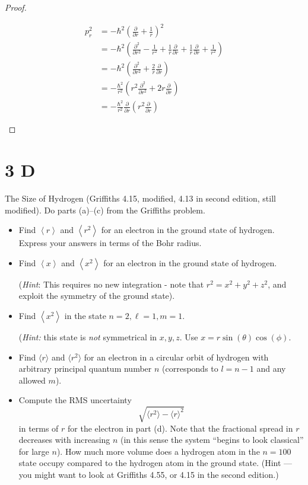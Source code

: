 \documentclass{article}
\begin{document}
\begin{proof}
\begin{itemize}
        \begin{align}
            p_r^2 &= -\hbar^2\left(\frac{\partial}{\partial r}+\frac{1}{r}\right)^2\\
            &= -\hbar^2\left(\frac{\partial^2}{\partial r^2}-\frac{1}{r^2}+\frac{1}{r}\frac{\partial}{\partial r}+\frac{1}{r}\frac{\partial }{\partial r}+\frac{1}{r^2}\right)\\
            &= -\hbar^2\left(\frac{\partial^2}{\partial r^2}+\frac{2}{r}\frac{\partial}{\partial r}\right)\\
            &= -\frac{\hbar^2}{r^2}\left(r^2\frac{\partial^2}{\partial r^2}+2r\frac{\partial}{\partial r}\right)\\
            &= -\frac{\hbar^2}{r^2}\frac{\partial}{\partial r}\left(r^2\frac{\partial}{\partial r}\right)
        \end{align}
    \end{itemize}
\end{proof}

\newpage

\section*{3 D}
\begin{ques}\label{q3}
The Size of Hydrogen (Griffiths 4.15, modified, 4.13 in second edition, still modified). Do parts (a)--(c) from the Griffiths problem.

\begin{itemize}
\item[(a)] Find $\left<r\right>$ and $\left<r^2\right>$ for an electron in the ground state of hydrogen. Express your answers in terms of the Bohr radius.
\item[(b)] Find $\left<x\right>$ and $\left<x^2\right>$ for an electron in the ground state of hydrogen. 

(\emph{Hint}: This requires no new integration - note that $r^2=x^2+y^2+z^2$, and exploit the symmetry of the ground state).

\item[(c)] Find $\left<x^2\right>$ in the state $n=2,\ell=1,m=1$. 

(\emph{Hint:} this state is \emph{not} symmetrical in $x,y,z$. Use $x=r\sin(\theta)\cos(\phi)$. 

\item[(d)] Find $\langle r\rangle$ and $\langle r^2\rangle$ for an electron in a circular orbit of hydrogen with arbitrary principal quantum number $n$ (corresponds to $l=n-1$ and any allowed $m$).

\item[(e)] Compute the RMS uncertainty
\[
\sqrt{\langle r^2\rangle - \langle r\rangle^2}
\]
in terms of $r$ for the electron in part (d). Note that the fractional spread in $r$ decreases with increasing $n$ (in this sense the system ``begins to look classical'' for large $n$). How much more volume does a hydrogen atom in the $n=100$ state occupy compared to the hydrogen atom in the ground state. (Hint --- you might want to look at Griffiths 4.55, or 4.15 in the second edition.)
\end{itemize}
\end{ques}
\end{document}
